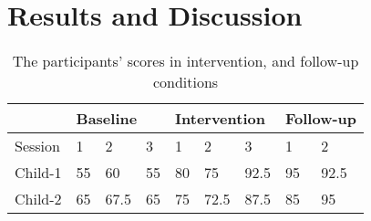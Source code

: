 \chapter{Results and Discussion}

    \lipsum[2-3]
    
\begin{table}[H]
\centering
\begin{tabular}{|l|l|l|l|l|l|l|l|l|}
\hline
        & \multicolumn{3}{l|}{Baseline} & \multicolumn{3}{l|}{Intervention} & \multicolumn{2}{l|}{Follow-up} \\ \hline
Session &  1 &  2   &  3  &   1 &  2   &  3   &  1 &  2   \\ \hline
Child-1 & 55 & 60   & 55  &  80 & 75   & 92.5 & 95 & 92.5 \\ \hline
Child-2 & 65 & 67.5 & 65  &  75 & 72.5 & 87.5 & 85 & 95   \\ \hline
\end{tabular}
\caption{The participants' scores in  intervention, and follow-up conditions}
\label{performance_participant}
\end{table}
    
    \lipsum[2-3]